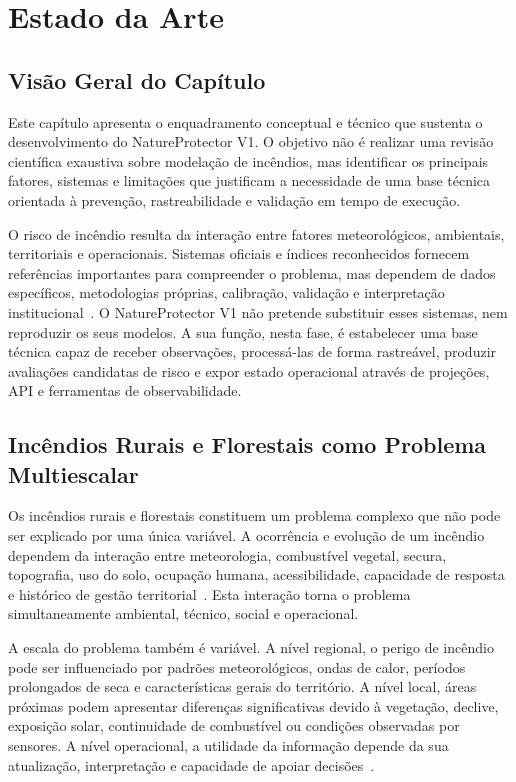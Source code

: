 \chapter{Estado da Arte}

\section{Visão Geral do Capítulo}

Este capítulo apresenta o enquadramento conceptual e técnico que sustenta o desenvolvimento do NatureProtector V1. O objetivo não é realizar uma revisão científica exaustiva sobre modelação de incêndios, mas identificar os principais fatores, sistemas e limitações que justificam a necessidade de uma base técnica orientada à prevenção, rastreabilidade e validação em tempo de execução.

O risco de incêndio resulta da interação entre fatores meteorológicos, ambientais, territoriais e operacionais. Sistemas oficiais e índices reconhecidos fornecem referências importantes para compreender o problema, mas dependem de dados específicos, metodologias próprias, calibração, validação e interpretação institucional~\citep{nrcan_fwi_system,ipma_fwi,ec_jrc_effis}. O NatureProtector V1 não pretende substituir esses sistemas, nem reproduzir os seus modelos. A sua função, nesta fase, é estabelecer uma base técnica capaz de receber observações, processá-las de forma rastreável, produzir avaliações candidatas de risco e expor estado operacional através de projeções, API e ferramentas de observabilidade.

\section{Incêndios Rurais e Florestais como Problema Multiescalar}

Os incêndios rurais e florestais constituem um problema complexo que não pode ser explicado por uma única variável. A ocorrência e evolução de um incêndio dependem da interação entre meteorologia, combustível vegetal, secura, topografia, uso do solo, ocupação humana, acessibilidade, capacidade de resposta e histórico de gestão territorial~\citep{icnf_incendios_rurais,nrcan_fwi_system,clms_corine_land_cover}. Esta interação torna o problema simultaneamente ambiental, técnico, social e operacional.

A escala do problema também é variável. A nível regional, o perigo de incêndio pode ser influenciado por padrões meteorológicos, ondas de calor, períodos prolongados de seca e características gerais do território. A nível local, áreas próximas podem apresentar diferenças significativas devido à vegetação, declive, exposição solar, continuidade de combustível ou condições observadas por sensores. A nível operacional, a utilidade da informação depende da sua atualização, interpretação e capacidade de apoiar decisões~\citep{copernicus_effis,ec_jrc_effis}.

